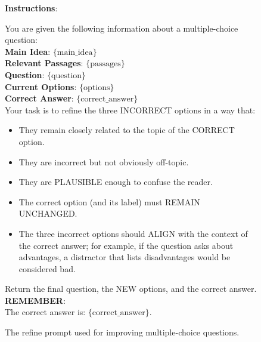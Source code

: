 \begin{figure}[h]
\centering
\begin{tcolorbox}[width=\columnwidth,fontupper=\footnotesize, title=Option Refinement Prompt]
\RaggedRight
\obeylines
\textbf{Instructions}: \\
{You are given the following information about a multiple-choice question: \\

\textbf{Main Idea}: $\{\text{main\_idea}\}$ \\

\textbf{Relevant Passages}: $\{\text{passages}\}$ \\
\vspace{3mm}
\textbf{Question}: $\{\text{question}\}$ \\

\textbf{Current Options}: $\{\text{options}\}$ \\

\textbf{Correct Answer}: $\{\text{correct\_answer}\}$ \\
\vspace{3mm}
Your task is to refine the three INCORRECT options in a way that:
\begin{itemize}[label=-,nosep]
    \item They remain closely related to the topic of the CORRECT option.
    \item They are incorrect but not obviously off-topic.
    \item They are PLAUSIBLE enough to confuse the reader.
    \item The correct option (and its label) must REMAIN UNCHANGED.
    \item The three incorrect options should ALIGN with the context of the correct answer; 
          for example, if the question asks about advantages, a distractor that lists disadvantages would be considered bad.
\end{itemize}

Return the final question, the NEW options, and the correct answer. \\
\vspace{3mm}
\textbf{REMEMBER}: \\
The correct answer is: $\{\text{correct\_answer}\}$.
}
\end{tcolorbox}
\centering
\caption{The refine prompt used for improving multiple-choice questions.}
\label{fig:refine_prompt}
\end{figure}


